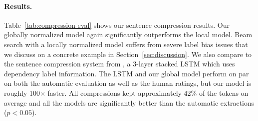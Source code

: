 \paragraph{Results.}

Table~\ref{tab:compression-eval} shows our sentence compression results.
Our globally normalized model again significantly outperforms the local model.
Beam search with a locally normalized model suffers from severe label bias issues
that we discuss on a concrete example in Section~\ref{sec:discussion}.
We also compare to the sentence compression system
from , a 3-layer stacked LSTM which uses dependency
label information.
The LSTM and our global model perform on par on both the automatic evaluation
as well as the human ratings, but our model is roughly 100$\times$ faster.
All compressions kept approximately 42\% of the tokens on average and
all the models are significantly better than the automatic extractions ($p < 0.05$).

